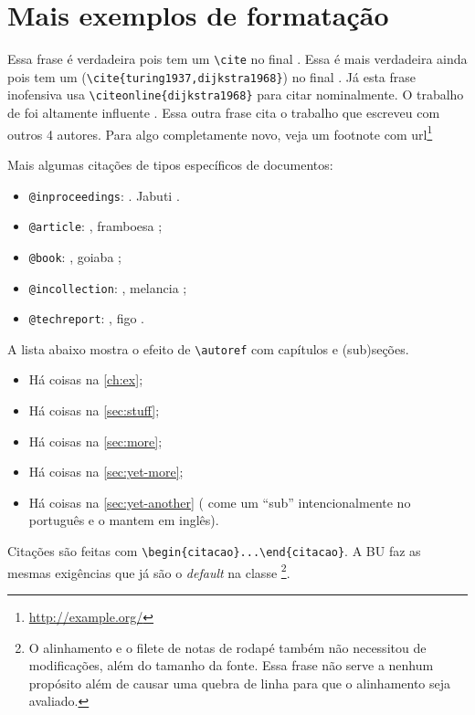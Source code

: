 \documentclass[embeddedlogo]{ufsc-thesis-rn46-2019}
\newcommand{\lacmd}[1]{\texttt{\textbackslash{}#1}}
\newcommand{\laenv}[1]{\texttt{\textbackslash{}begin\{#1\}...\textbackslash{}end\{#1\}}}
\begin{document}
\chapter{Mais exemplos de formatação}
\label{ch:ex}

Essa frase é verdadeira pois tem um \lacmd{cite} no final \cite{turing1937}. Essa
é mais verdadeira ainda pois tem um (\lacmd{cite\{turing1937,dijkstra1968\}}) no
final \cite{turing1937,dijkstra1968}. Já esta frase inofensiva usa
\lacmd{citeonline\{dijkstra1968\}} para citar 
nominalmente. O trabalho de  foi altamente influente
\cite{diffie1976}. Essa outra frase cita o trabalho que 
escreveu com outros 4 autores. Para algo completamente novo, veja um footnote
com url\footnote{\url{http://example.org/}}

Mais algumas citações de tipos específicos de documentos:
\begin{itemize}
\item \texttt{@inproceedings}: . Jabuti
  \cite{Ullman1989magic}.
\item \texttt{@article}: , framboesa \cite{Distefano2019};
\item \texttt{@book}: , goiaba \cite{Abiteboul1995};
\item \texttt{@incollection}: , melancia \cite{Forgy1989};
\item \texttt{@techreport}: , figo \cite{rdf11}.
\end{itemize}

A lista abaixo mostra o efeito de \lacmd{autoref{}} com capítulos e (sub)seções.

\begin{itemize}
\item Há coisas na \autoref{ch:ex};
\item Há coisas na \autoref{sec:stuff};
\item Há coisas na \autoref{sec:more};
\item Há coisas na \autoref{sec:yet-more};
\item Há coisas na \autoref{sec:yet-another} (\abnTeX{} come um ``sub''
  intencionalmente no português e o mantem em inglês).
\end{itemize}

Citações são feitas com \laenv{citacao}. A BU faz as mesmas exigências que já
são o \textit{default} na classe \abnTeX\footnote{O alinhamento e o filete de
  notas de rodapé também não necessitou de modificações, além do tamanho da
  fonte. Essa frase não serve a nenhum propósito além de causar uma quebra de
  linha para que o alinhamento seja avaliado.}.
\end{document}
